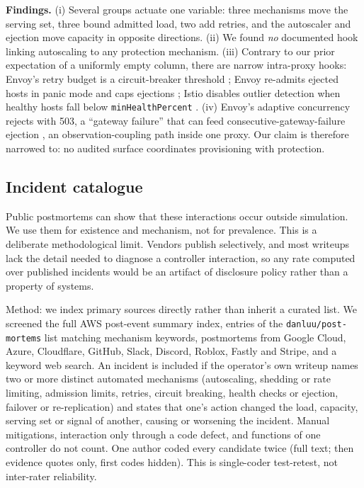 \documentclass[conference]{IEEEtran}
\begin{document}
\textbf{Findings.} (i) Several groups actuate one variable: three
mechanisms move the serving set, three bound admitted load, two add retries,
and the autoscaler and ejection move capacity in opposite directions. (ii) We
found \emph{no} documented hook linking autoscaling to any protection
mechanism. (iii) Contrary to our prior expectation of a uniformly empty
column, there are narrow intra-proxy hooks: Envoy's retry budget is a
circuit-breaker threshold \cite{envoycb}; Envoy re-admits ejected hosts in
panic mode and caps ejections \cite{envoyoutlier,envoypanic}; Istio disables
outlier detection when healthy hosts fall below \texttt{minHealthPercent}
\cite{istiodr}. (iv) Envoy's adaptive concurrency rejects with 503, a
``gateway failure'' that can feed consecutive-gateway-failure ejection
\cite{envoyoutlier}, an observation-coupling path inside one proxy. Our claim
is therefore narrowed to: no audited surface coordinates provisioning with
protection.

\subsection{Incident catalogue}

Public postmortems can show that these interactions occur outside
simulation. We use them for existence and mechanism, not for prevalence.
This is a deliberate methodological limit. Vendors publish selectively, and
most writeups lack the detail needed to diagnose a controller interaction,
so any rate computed over published incidents would be an artifact of
disclosure policy rather than a property of systems.

Method: we index primary sources directly rather than inherit a curated
list. We screened the full AWS post-event summary index, entries of the
\texttt{danluu/post-mortems} list matching mechanism keywords, postmortems
from Google Cloud, Azure, Cloudflare, GitHub, Slack, Discord, Roblox, Fastly
and Stripe, and a keyword web search. An incident is included if the
operator's own writeup names two or more distinct automated mechanisms
(autoscaling, shedding or rate limiting, admission limits, retries, circuit
breaking, health checks or ejection, failover or re-replication) and states
that one's action changed the load, capacity, serving set or signal of
another, causing or worsening the incident. Manual mitigations, interaction
only through a code defect, and functions of one controller do not count.
One author coded every candidate twice (full text; then evidence quotes
only, first codes hidden). This is single-coder test-retest, not
inter-rater reliability.
\end{document}
